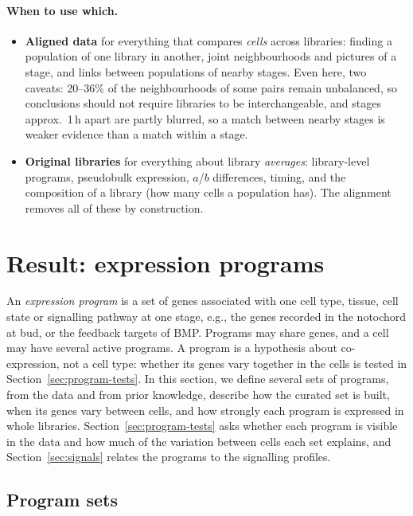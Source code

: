 \documentclass[11pt,a4paper]{article}
\begin{document}
\paragraph{When to use which.}
\begin{itemize}
	\item \textbf{Aligned data} for everything that compares \emph{cells} across libraries: finding a population of one library in another, joint neighbourhoods and pictures of a stage, and links between populations of nearby stages. Even here, two caveats: 20--36\% of the neighbourhoods of some pairs remain unbalanced, so conclusions should not require libraries to be interchangeable, and stages approx.~1\,h apart are partly blurred, so a match between nearby stages is weaker evidence than a match within a stage.
	\item \textbf{Original libraries} for everything about library \emph{averages}: library-level programs, pseudobulk expression, $a$/$b$ differences, timing, and the composition of a library (how many cells a population has). The alignment removes all of these by construction.
\end{itemize}

\section{Result: expression programs}
\label{sec:programs}

An \emph{expression program} is a set of genes associated with one cell type, tissue, cell state or signalling pathway at one stage, e.g., the genes recorded in the notochord at bud, or the feedback targets of BMP. Programs may share genes, and a cell may have several active programs. A program is a hypothesis about co-expression, not a cell type: whether its genes vary together in the cells is tested in Section~\ref{sec:program-tests}. In this section, we define several sets of programs, from the data and from prior knowledge, describe how the curated set is built, when its genes vary between cells, and how strongly each program is expressed in whole libraries. Section~\ref{sec:program-tests} asks whether each program is visible in the data and how much of the variation between cells each set explains, and Section~\ref{sec:signals} relates the programs to the signalling profiles.

\subsection{Program sets}
\label{sec:program-sets}
\end{document}
